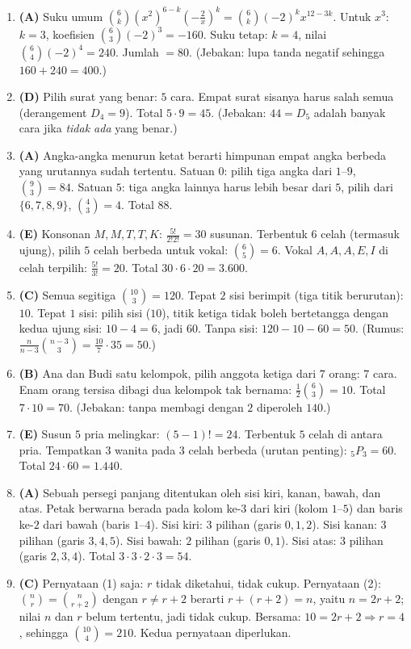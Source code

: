 \documentclass[a4paper,11pt]{article}
\newcommand{\Pm}[2]{{}_{#1}P_{#2}}
\newcounter{no}
\begin{document}
\begin{enumerate}[leftmargin=2em,itemsep=2pt,topsep=2pt]
\item[\textbf{11.}] \textbf{(A)} Suku umum $\binom6k(x^2)^{6-k}\left(-\frac2x\right)^k=\binom6k(-2)^kx^{12-3k}$. Untuk $x^3$: $k=3$, koefisien $\binom63(-2)^3=-160$. Suku tetap: $k=4$, nilai $\binom64(-2)^4=240$. Jumlah $=80$. (Jebakan: lupa tanda negatif sehingga $160+240=400$.)
\item[\textbf{12.}] \textbf{(D)} Pilih surat yang benar: $5$ cara. Empat surat sisanya harus salah semua (derangement $D_4=9$). Total $5\cdot9=45$. (Jebakan: $44=D_5$ adalah banyak cara jika \emph{tidak ada} yang benar.)
\item[\textbf{13.}] \textbf{(A)} Angka-angka menurun ketat berarti himpunan empat angka berbeda yang urutannya sudah tertentu. Satuan $0$: pilih tiga angka dari $1$--$9$, $\binom93=84$. Satuan $5$: tiga angka lainnya harus lebih besar dari $5$, pilih dari $\{6,7,8,9\}$, $\binom43=4$. Total $88$.
\item[\textbf{14.}] \textbf{(E)} Konsonan $M,M,T,T,K$: $\frac{5!}{2!2!}=30$ susunan. Terbentuk $6$ celah (termasuk ujung), pilih $5$ celah berbeda untuk vokal: $\binom65=6$. Vokal $A,A,A,E,I$ di celah terpilih: $\frac{5!}{3!}=20$. Total $30\cdot6\cdot20=3.600$.
\item[\textbf{15.}] \textbf{(C)} Semua segitiga $\binom{10}3=120$. Tepat $2$ sisi berimpit (tiga titik berurutan): $10$. Tepat $1$ sisi: pilih sisi ($10$), titik ketiga tidak boleh bertetangga dengan kedua ujung sisi: $10-4=6$, jadi $60$. Tanpa sisi: $120-10-60=50$. (Rumus: $\frac{n}{n-3}\binom{n-3}{3}=\frac{10}{7}\cdot35=50$.)
\item[\textbf{16.}] \textbf{(B)} Ana dan Budi satu kelompok, pilih anggota ketiga dari $7$ orang: $7$ cara. Enam orang tersisa dibagi dua kelompok tak bernama: $\frac12\binom63=10$. Total $7\cdot10=70$. (Jebakan: tanpa membagi dengan $2$ diperoleh $140$.)
\item[\textbf{17.}] \textbf{(E)} Susun $5$ pria melingkar: $(5-1)!=24$. Terbentuk $5$ celah di antara pria. Tempatkan $3$ wanita pada $3$ celah berbeda (urutan penting): $\Pm53=60$. Total $24\cdot60=1.440$.
\item[\textbf{18.}] \textbf{(A)} Sebuah persegi panjang ditentukan oleh sisi kiri, kanan, bawah, dan atas. Petak berwarna berada pada kolom ke-$3$ dari kiri (kolom $1$--$5$) dan baris ke-$2$ dari bawah (baris $1$--$4$). Sisi kiri: $3$ pilihan (garis $0,1,2$). Sisi kanan: $3$ pilihan (garis $3,4,5$). Sisi bawah: $2$ pilihan (garis $0,1$). Sisi atas: $3$ pilihan (garis $2,3,4$). Total $3\cdot3\cdot2\cdot3=54$.
\item[\textbf{19.}] \textbf{(C)} Pernyataan (1) saja: $r$ tidak diketahui, tidak cukup. Pernyataan (2): $\binom nr=\binom n{r+2}$ dengan $r\neq r+2$ berarti $r+(r+2)=n$, yaitu $n=2r+2$; nilai $n$ dan $r$ belum tertentu, jadi tidak cukup. Bersama: $10=2r+2\Rightarrow r=4$, sehingga $\binom{10}4=210$. Kedua pernyataan diperlukan.

\end{enumerate}
\end{document}
